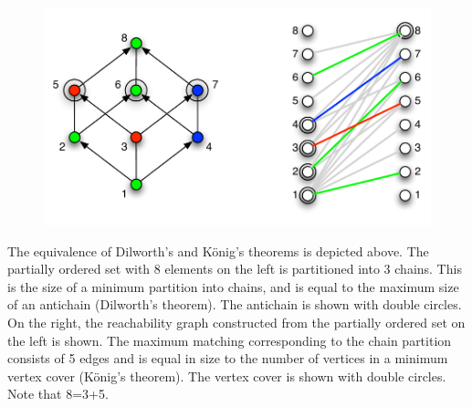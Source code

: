 \documentclass[12pt]{amsart}
\theoremstyle{definition}
\begin{document}
\begin{figure}[!ht] 
    \includegraphics[scale=0.8]{pdfs/Dilworth_Konig}

\end{figure}
The equivalence of Dilworth's and K\"{o}nig's theorems is depicted above. The
      partially ordered set with 8 elements on the left is partitioned into 3
      chains. This is the size of a minimum partition into chains, and
    is equal to the maximum size of an antichain (Dilworth's
    theorem). The antichain is shown with double circles. On the
    right, the reachability graph constructed from the partially
    ordered set on the left is shown. The maximum matching
    corresponding to the chain partition consists of 5 edges and is equal in size to the
    number of vertices in a minimum vertex cover (K\"{o}nig's
    theorem). The vertex cover is shown with double circles. Note that
    8=3+5.


\newpage
\end{document}
